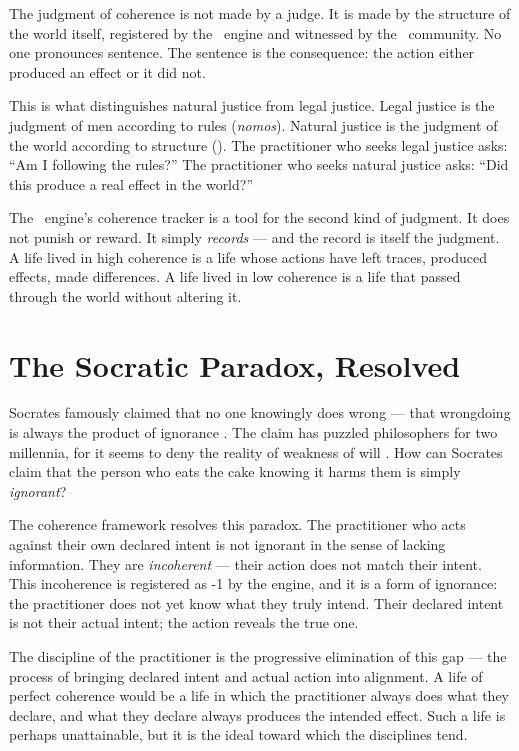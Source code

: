 The judgment of coherence is not made by a judge. It is made by the structure
of the world itself, registered by the \physis\ engine and witnessed by the
\praxis\ community. No one pronounces sentence. The sentence is the consequence:
the action either produced an effect or it did not.

This is what distinguishes natural justice from legal justice. Legal justice is
the judgment of men according to rules (\emph{nomos}). Natural justice is the
judgment of the world according to structure (\physis). The practitioner who
seeks legal justice asks: ``Am I following the rules?'' The practitioner who
seeks natural justice asks: ``Did this produce a real effect in the world?''

The \physis\ engine's coherence tracker is a tool for the second kind of
judgment. It does not punish or reward. It simply \emph{records} --- and the
record is itself the judgment. A life lived in high coherence is a life whose
actions have left traces, produced effects, made differences. A life lived in
low coherence is a life that passed through the world without altering it.

\section{The Socratic Paradox, Resolved}

Socrates famously claimed that no one knowingly does wrong --- that wrongdoing
is always the product of ignorance \parencite{plato1997complete}. The claim has
puzzled philosophers for two millennia, for it seems to deny the reality of weakness
of will \parencite{macintyre1981virtue}. How can Socrates
claim that the person who eats the cake knowing it harms them is simply
\emph{ignorant}?

The coherence framework resolves this paradox. The practitioner who acts against
their own declared intent is not ignorant in the sense of lacking information.
They are \emph{incoherent} --- their action does not match their intent. This
incoherence is registered as -1 by the engine, and it is a form of ignorance:
the practitioner does not yet know what they truly intend. Their declared intent
is not their actual intent; the action reveals the true one.

The discipline of the practitioner is the progressive elimination of this gap
--- the process of bringing declared intent and actual action into alignment.
A life of perfect coherence would be a life in which the practitioner always
does what they declare, and what they declare always produces the intended
effect. Such a life is perhaps unattainable, but it is the ideal toward which
the disciplines tend.

